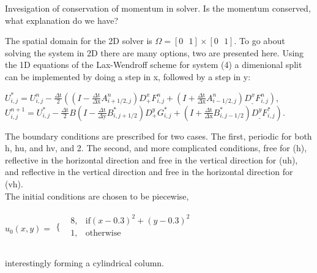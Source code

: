 \documentclass{article}
\begin{document}
Invesigation of conservation of momentum in solver. Is the momentum conserved, what explanation do we have?




The spatial domain for the 2D solver is \(\Omega =[0\text{  }1]\times [0\text{  }1].\) To go about solving the system in 2D there are many options,
two are presented here. Using the 1D equations of the Lax-Wendroff scheme for system (4) a dimenional split can be implemented by doing a step in
x, followed by a step in y: 

\(U_{i,j}^*=U_{i,j}^n-\frac{\text{$\Delta $t}}{2}\left(\left(I-\frac{\text{$\Delta $t}}{\text{$\Delta $x}}A_{i+1/2,j}^n\right)D_+^xF_{i,j}^n+\left(I+\frac{\text{$\Delta
$t}}{\text{$\Delta $x}}A_{i-1/2,j}^n\right)D_{\_}^xF_{i,j}^n\right)\),\\
\(U_{i,j}^{n+1}=U_{i,j}^*-\frac{\text{$\Delta $t}}{2}B\left(I-\frac{\text{$\Delta $t}}{\text{$\Delta $y}}B_{i,j+1/2}^*\right)D_+^yG_{i,j}^*+\)\(\left.\left(I+\frac{\text{$\Delta
$t}}{\text{$\Delta $x}}B_{i,j-1/2}^*\right)D_{\_}^yF_{i,j}^*\right)\).

The boundary conditions are prescribed for two cases. The first, periodic for both h, hu, and hv, and 2. The second, and more complicated conditions,
free for (h), reflective in the horizontal direction and free in the vertical direction for (uh), and reflective in the vertical direction and free
in the horizontal direction for (vh).\\
The initial conditions are chosen to be piecewise, 

\(u_0(x,y)=
\begin{array}{ll}
 \{ & 
\begin{array}{ll}
 8, & \text{if} (x-0.3)^2+(y-0.3)^2 \\
 1, & \text{otherwise} \\
\end{array}
 \\
\end{array}\)

interestingly forming a cylindrical column. 
\end{document}
